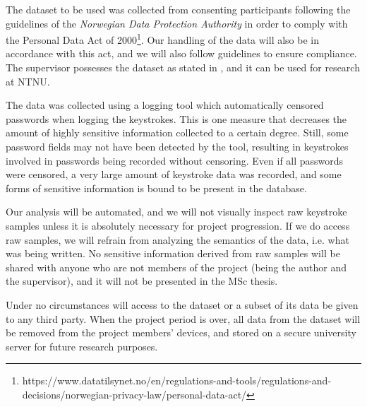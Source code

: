\documentclass[informationsecurity]{gucmasterproject}
\begin{document}
The dataset to be used \cite{mondal} was collected from consenting participants following the guidelines of the \textit{Norwegian Data Protection Authority} in order to comply with the Personal Data Act of 2000\footnote{https://www.datatilsynet.no/en/regulations-and-tools/regulations-and-decisions/norwegian-privacy-law/personal-data-act/}.
Our handling of the data will also be in accordance with this act, and we will also follow guidelines to ensure compliance.
The supervisor possesses the dataset as stated in , and it can be used for research at NTNU.

The data was collected using a logging tool which automatically censored passwords when logging the keystrokes. 
This is one measure that decreases the amount of highly sensitive information collected to a certain degree.
Still, some password fields may not have been detected by the tool, resulting in keystrokes involved in passwords being recorded without censoring. 
Even if all passwords were censored, a very large amount of keystroke data was recorded, and some forms of sensitive information is bound to be present in the database.

Our analysis will be automated, and we will not visually inspect raw keystroke samples unless it is absolutely necessary for project progression.
If we do access raw samples, we will refrain from analyzing the semantics of the data, i.e. what was being written.
No sensitive information derived from raw samples will be shared with anyone who are not members of the project (being the author and the supervisor), and it will not be presented in the MSc thesis.

Under no circumstances will access to the dataset or a subset of its data be given to any third party.
When the project period is over, all data from the dataset will be removed from the project members' devices, and stored on a secure university server for future research purposes.


%
\end{document}
